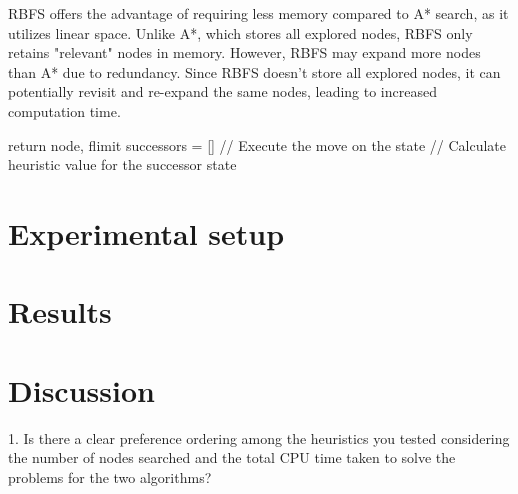 \documentclass{article}
\begin{document}
RBFS offers the advantage of requiring less memory compared to A* search, as it utilizes linear space. Unlike A*, which stores all explored nodes, RBFS only retains "relevant" nodes in memory. However, RBFS may expand more nodes than A* due to redundancy. Since RBFS doesn't store all explored nodes, it can potentially revisit and re-expand the same nodes, leading to increased computation time.
\begin{algorithm}
   
  \State return node, flimit
        \EndIf
        \State successors = []
             // Execute the move on the state
             // Calculate heuristic value for the successor state
            \EndIf
            \EndFor
        \EndIf

            \EndIf
            \EndIf
            \EndWhile
  \label{alg:RBFS}
\end{algorithm}

\section{Experimental setup}

\section{Results}



\section{Discussion}
1. Is there a clear preference ordering among the heuristics you tested considering the number of nodes searched and the total CPU time taken to solve the problems for the two algorithms?
\end{document}
